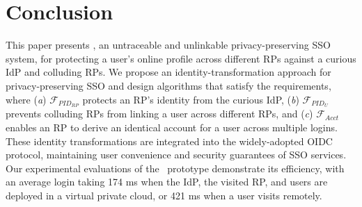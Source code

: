 \section{Conclusion}
\label{sec:conclusion}
This paper presents \usso, an untraceable and unlinkable privacy-preserving SSO system, for protecting a user's online profile across different RPs against a curious IdP and colluding RPs. We propose an identity-transformation approach for privacy-preserving SSO and design algorithms that satisfy the requirements, where (\emph{a}) $\mathcal{F}_{PID_{RP}}$ protects an RP's identity from the curious IdP, (\emph{b}) $\mathcal{F}_{PID_{U}}$ prevents colluding RPs from linking a user across different RPs, and (\emph{c}) $\mathcal{F}_{Acct}$ enables an RP to derive an identical account for a user across multiple logins. These identity transformations are integrated into the widely-adopted OIDC protocol, maintaining user convenience and security guarantees of SSO services. Our experimental evaluations of the \usso~prototype demonstrate its efficiency, with an average login taking 174 ms when the IdP, the visited RP, and users are deployed in a virtual private cloud, or 421 ms when a user visits remotely.

